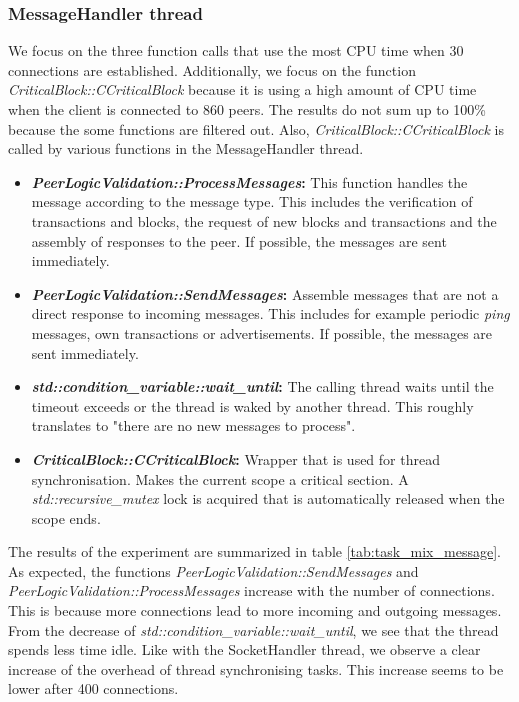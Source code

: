 \subsubsection{MessageHandler thread}
We focus on the three function calls that use the most CPU time when 30 connections are established. Additionally, we focus on the function \textit{CriticalBlock::CCriticalBlock} because it is using a high amount of CPU time when the client is connected to 860 peers. The results do not sum up to 100\% because the some functions are filtered out. Also, \textit{CriticalBlock::CCriticalBlock} is called by various functions in the MessageHandler thread.
\begin{itemize}
	\item \textbf{\textit{PeerLogicValidation::ProcessMessages}:} This function handles the message according to the message type. This includes the verification of transactions and blocks, the request of new blocks and transactions and the assembly of responses to the peer. If possible, the messages are sent immediately.
	\item \textbf{\textit{PeerLogicValidation::SendMessages}:} Assemble messages that are not a direct response to incoming messages. This includes for example periodic \textit{ping} messages, own transactions or advertisements. If possible, the messages are sent immediately.
	\item \textbf{\textit{std::condition\_variable::wait\_until}:} The calling thread waits until the timeout exceeds or the thread is waked by another thread. This roughly translates to "there are no new messages to process".
	\item \textbf{\textit{CriticalBlock::CCriticalBlock}:} Wrapper that is used for thread synchronisation. Makes the current scope a critical section. A \textit{std::recursive\_mutex} lock is acquired that is automatically released when the scope ends.
\end{itemize}
The results of the experiment are summarized in table \ref{tab:task_mix_message}. As expected, the functions \textit{PeerLogicValidation::SendMessages} and \textit{PeerLogicValidation::ProcessMessages} increase with the number of connections. This is because more connections lead to more incoming and outgoing messages. From the decrease of \textit{std::condition\_variable::wait\_until}, we see that the thread spends less time idle. Like with the SocketHandler thread, we observe a clear increase of the overhead of thread synchronising tasks. This increase seems to be lower after 400 connections.

